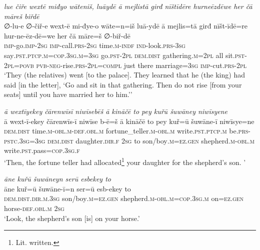 \ea \label{KŠ.87}
\textit{lue čiře wextē miđyo wāteniš, luāydē ā mejlistā girđ nīštīdēre hurneēzdēwe her čā māreš biřdē} \\ 
\gll ∅-lu-e ∅-čiř-e wext-ē mi-đye-o wāte=n=iš luā-ydē ā mejlis=tā girđ nīšt-īdē=re hur-ne-ēz-dē=we her čā māre=š ∅-biř-dē \\ 
 \textsc{imp-}go.\textsc{imp-}\textsc{2sg} \textsc{imp-}call\textsc{.prs}-\textsc{2sg} time\textsc{.m}\textsc{-indf} \textsc{ind-}look\textsc{.prs}\textsc{-3sg} say\textsc{.pst}\textsc{.ptcp}\textsc{.m}\textsc{=cop}\textsc{.3sg}\textsc{.m}\textsc{=3sg} go\textsc{.pst}-\textsc{2pl} \textsc{dem.dist} gathering\textsc{.m}=\textsc{2pl} all sit\textsc{.pst}-\textsc{2pl}\textsc{=\textsc{povb}} \textsc{pvb-}\textsc{neg-}rise\textsc{.prs}-\textsc{2pl}\textsc{=compl} just there marriage\textsc{=3sg} \textsc{imp-}cut\textsc{.prs}-\textsc{2pl} \\ 
\glt `They (the relatives) went [to the palace]. They learned that he (the king) had said [in the letter], ‘Go and sit in that gathering. Then do not rise [from your seats] until you have married her to him.’'
\z 
 
\ea \label{KŠ.99}
\textit{ā wextīyekey čārenwīsī niwīsebēš ā kināčē to pey kuřū šuwāney niwīsyene} \\ 
\gll ā wext-ī-ekey čārenwīs-ī niwīse b-ē=š ā kināčē to pey kuř=ū šuwāne-ī niwīsye=ne \\ 
 \textsc{dem.dist} time\textsc{.m}\textsc{-obl}\textsc{.m}\textsc{-def}\textsc{.obl}\textsc{.m} fortune\_teller\textsc{.m}\textsc{-obl}\textsc{.m} write\textsc{.pst}\textsc{.ptcp}\textsc{.m} be\textsc{.prs}\textsc{-pstc}\textsc{.3sg}\textsc{=3sg} \textsc{dem.dist} daughter\textsc{.dir}\textsc{.f} \textsc{2sg} to son/boy\textsc{.m}\textsc{\textsc{=ez.gen}} shepherd\textsc{.m}\textsc{-obl}\textsc{.m} write\textsc{.pst}.pass\textsc{=cop}\textsc{.3sg}\textsc{.f} \\ 
\glt `Then, the fortune teller had allocated\footnote{Lit. written.} your daughter for the shepherd’s son. '
\z 
 
\ea \label{KŠ.100}
\textit{āne kuřū šuwāneyn serū esbekey to} \\ 
\gll āne kuř=ū šuwāne-ī=n ser=ū esb-ekey to \\ 
 \textsc{dem.dist}\textsc{.dir}\textsc{.m}\textsc{.3sg} son/boy\textsc{.m}\textsc{\textsc{=ez.gen}} shepherd\textsc{.m}\textsc{-obl}\textsc{.m}\textsc{=cop}\textsc{.3sg}\textsc{.m} on\textsc{\textsc{=ez.gen}} horse\textsc{-def}\textsc{.obl}\textsc{.m} \textsc{2sg} \\ 
\glt `Look, the shepherd’s son [is] on your horse.'
\z 
 
